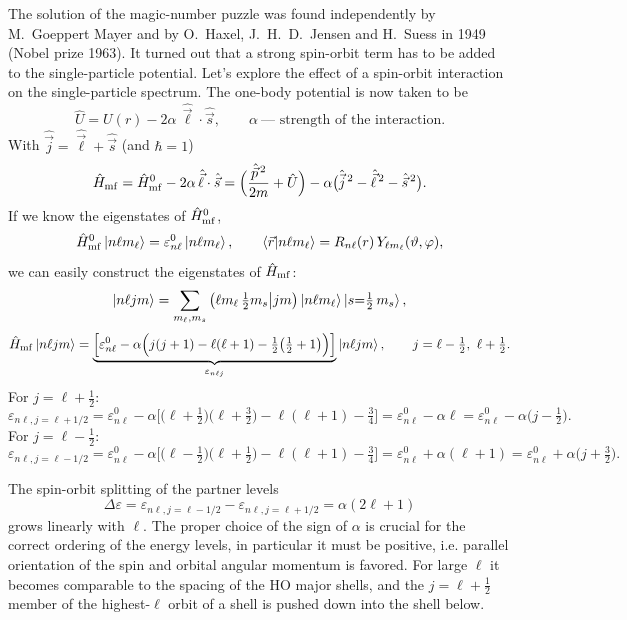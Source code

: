 \documentclass[11pt,a4paper]{article}
\newcommand{\op}[1]{\hat{#1}}
\begin{document}
The solution of the magic-number puzzle was found independently by M.~Goeppert Mayer and by O.~Haxel, J.~H.~D.~Jensen and H.~Suess in 1949 (Nobel prize 1963). It turned out that a strong spin-orbit term has to be added to the single-particle potential.
Let's explore the effect of a spin-orbit interaction on the single-particle spectrum. The one-body potential is now taken to be
\[
\op U=U(r)-2\alpha\,\op{\vec\ell}\cdot\op{\vec s},\qquad \alpha\ \text{--- strength of the interaction}.
\]
With $\op{\vec j}=\op{\vec\ell}+\op{\vec s}$ (and $\hbar=1$)
\[
\op H_{\rm mf}=\op H^0_{\rm mf}-2\alpha\,\op{\vec\ell}\cdot\op{\vec s}
=\Big(\frac{\op{\vec p}^{\,2}}{2m}+\op U\Big)-\alpha\big(\op{\vec j}^{\,2}-\op{\vec\ell}^{\,2}-\op{\vec s}^{\,2}\big).
\]
If we know the eigenstates of $\op H^0_{\rm mf}$,
\[
\op H^0_{\rm mf}\ket{n\ell m_\ell}=\varepsilon^0_{n\ell}\ket{n\ell m_\ell},\qquad
\braket{\vec r|n\ell m_\ell}=R_{n\ell}(r)\,Y_{\ell m_\ell}(\vartheta,\varphi),
\]
we can easily construct the eigenstates of $\op H_{\rm mf}$:
\[
\ket{n\ell jm}=\sum_{m_\ell,m_s}\big(\ell m_\ell\,\tfrac12 m_s\big|jm\big)\ket{n\ell m_\ell}\ket{s{=}\tfrac12\,m_s},
\]
\[
\op H_{\rm mf}\ket{n\ell jm}=\underbrace{\Big[\varepsilon^0_{n\ell}-\alpha\Big(j(j+1)-\ell(\ell+1)-\tfrac12\big(\tfrac12+1\big)\Big)\Big]}_{\varepsilon_{n\ell j}}\ket{n\ell jm},
\qquad j=\ell-\tfrac12,\ \ell+\tfrac12 .
\]
For $j=\ell+\frac12$:
\[
\varepsilon_{n\ell,j=\ell+1/2}=\varepsilon^0_{n\ell}-\alpha\Big[\big(\ell+\tfrac12\big)\big(\ell+\tfrac32\big)-\ell(\ell+1)-\tfrac34\Big]
=\varepsilon^0_{n\ell}-\alpha\ell=\varepsilon^0_{n\ell}-\alpha\big(j-\tfrac12\big).
\]
For $j=\ell-\frac12$:
\[
\varepsilon_{n\ell,j=\ell-1/2}=\varepsilon^0_{n\ell}-\alpha\Big[\big(\ell-\tfrac12\big)\big(\ell+\tfrac12\big)-\ell(\ell+1)-\tfrac34\Big]
=\varepsilon^0_{n\ell}+\alpha(\ell+1)=\varepsilon^0_{n\ell}+\alpha\big(j+\tfrac32\big).
\]

The spin-orbit splitting of the partner levels
\[
\Delta\varepsilon=\varepsilon_{n\ell,j=\ell-1/2}-\varepsilon_{n\ell,j=\ell+1/2}=\alpha(2\ell+1)
\]
grows linearly with $\ell$. The proper choice of the sign of $\alpha$ is crucial for the correct ordering of the energy levels, in particular it must be positive, i.e. parallel orientation of the spin and orbital angular momentum is favored. For large $\ell$ it becomes comparable to the spacing of the HO major shells, and the $j=\ell+\frac12$ member of the highest-$\ell$ orbit of a shell is pushed down into the shell below.
\end{document}
